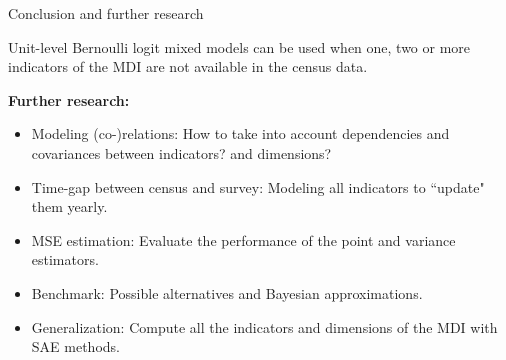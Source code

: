 \documentclass [xcolor=svgnames, t, 9pt] {beamer}
\begin{document}
\begin{frame}{Conclusion and further research}
    
Unit-level Bernoulli logit mixed models can be used when one, two or more indicators of the MDI are not available in the census data. 

    \vspace{0.3cm}

\pause

\textbf{Further research:}

\begin{itemize}
    \item Modeling (co-)relations: How to take into account dependencies and covariances between indicators? and dimensions?
    
        \vspace{0.3cm}
        
    \pause
    
\item Time-gap between census and survey: Modeling all indicators to ``update" them yearly. 

    \vspace{0.3cm}
    
\pause 

\item MSE estimation: Evaluate the performance of the point and variance estimators. 

\vspace{0.3cm}
    
\pause 

\item Benchmark: Possible alternatives and Bayesian approximations.

\vspace{0.3cm}




\pause 

\item Generalization: Compute all the indicators and dimensions of the MDI with SAE methods.

\end{itemize}


\end{frame}
\end{document}
